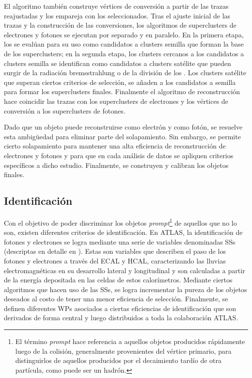 El algoritmo también construye vértices de conversión a partir de las trazas reajustadas y los empareja con los \topos seleccionados.
Tras el ajuste inicial de las trazas y la construcción de las conversiones, los algoritmos de superclusters de electrones y fotones se ejecutan por separado y en paralelo. En la primera etapa, los \topos se evalúan para su uso como candidatos a clusters semilla que forman la base de los superclusters; en la segunda etapa, los clusters cercanos a los candidatos a clusters semilla se identifican como candidatos a clusters satélite que pueden surgir de la radiación bremsstrahlung o de la división de los \topos. Los clusters satélite que superan ciertos criterios de selección, se añaden a los candidatos a semilla para formar los superclusters finales.
Finalmente el algoritmo de reconstrucción hace coincidir las trazas con los superclusters de electrones y los vértices de conversión a los superclusters de fotones.

Dado que un objeto puede reconstruirse como electrón y como fotón, se resuelve esta ambigüedad para eliminar parte del solapamiento. Sin embargo, se permite cierto solapamiento para mantener una alta eficiencia de reconstrucción de electrones y fotones y para que en cada análisis de datos se apliquen criterios específicos a dicho estudio. Finalmente, se construyen y calibran los objetos finales.



\subsection{Identificación}
\label{subsec:objects:egamma:id}

Con el objetivo de poder discriminar los objetos \textit{prompt}\footnote{El término \textit{prompt} hace referencia a aquellos objetos producidos rápidamente luego de la colisión, generalmente provenientes del vértice primario, para distinguirlos de aquellos producidos por el decaimiento tardío de otra partícula, como puede ser un hadrón.} de aquellos que no lo son, existen diferentes criterios de identificación.
En \ac{ATLAS}, la identificación de fotones y electrones se logra mediante una serie de variables denominadas \acfp{SS} (descriptas en detalle en \Ch{\ref{ch:pid_ss}}). Estas son variables que describen el paso de los fotones y electrones a través del \ac{ECAL} y \ac{HCAL}, caracterizando las lluvias electromagnéticas en su desarrollo lateral y longitudinal y son calculadas a partir de la energía depositada en las celdas de estos calorímetros. Mediante ciertos algoritmos que hacen uso de las \acp{SS}, se logra incrementar la pureza de los objetos deseados al costo de tener una menor eficiencia de selección.
Finalmente, se definen diferentes \acp{WP} asociados a ciertas eficiencias de identificación que son derivados de forma central y luego distribuidos a toda la colaboración \ac{ATLAS}.

